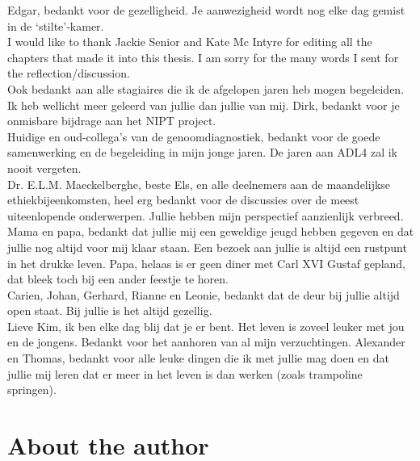 \begin{appendices}
	\noindent Edgar, bedankt voor de gezelligheid. Je aanwezigheid wordt nog elke dag gemist in de ‘stilte’-kamer.\\
	
	\noindent I would like to thank Jackie Senior and Kate Mc Intyre for editing all the chapters that made it into this thesis. I am sorry for the many words I sent for the reflection/discussion.\\ 
	
	\noindent Ook bedankt aan alle stagiaires die ik de afgelopen jaren heb mogen begeleiden. Ik heb wellicht meer geleerd van jullie dan jullie van mij. Dirk, bedankt voor je onmisbare bijdrage aan het NIPT project.\\
	
	\noindent Huidige en oud-collega’s van de genoomdiagnostiek, bedankt voor de goede samenwerking en de begeleiding in mijn jonge jaren. De jaren aan ADL4 zal ik nooit vergeten.\\
	
	\noindent Dr. E.L.M. Maeckelberghe, beste Els, en alle deelnemers aan de maandelijkse ethiekbijeenkomsten, heel erg bedankt voor de discussies over de meest uiteenlopende onderwerpen.  Jullie hebben mijn perspectief aanzienlijk verbreed.\\
	
	\noindent Mama en papa, bedankt dat jullie mij een geweldige jeugd hebben gegeven en dat jullie nog altijd voor mij klaar staan. Een bezoek aan jullie is altijd een rustpunt in het drukke leven. Papa, helaas is er geen diner met Carl XVI Gustaf gepland, dat bleek toch bij een ander feestje te horen.\\
	
	\noindent Carien, Johan, Gerhard, Rianne en Leonie, bedankt dat de deur bij jullie altijd open staat. Bij jullie is het altijd gezellig.\\
	
	\noindent Lieve Kim, ik ben elke dag blij dat je er bent. Het leven is zoveel leuker met jou en de jongens. Bedankt voor het aanhoren van al mijn verzuchtingen. Alexander en Thomas, bedankt voor alle leuke dingen die ik met jullie mag doen en dat jullie mij leren dat er meer in het leven is dan werken (zoals trampoline springen). 
	
	\chapter{About the author}
	

\end{appendices}

